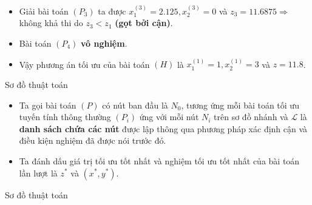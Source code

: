 \documentclass[10pt]{beamer}
\begin{document}
\begin{frame}
    \begin{itemize} 
    \item<1-> Giải bài toán $(P_3)$ ta được $x^{(3)}_1=2.125, x^{(3)}_2=0$ và $z_3=11.6875 \Rightarrow $ không khả thi do $z_3 < z_1$ \textbf{(gọt bởi cận)}. 
    \medskip
    \item<1-> Bài toán $(P_4)$ \textbf{vô nghiệm}.
    \bigskip
    \item<2-> Vậy phương án tối ưu của bài toán $(H)$ là $x^{(1)}_1=1, x^{(1)}_2=3$ và $z=11.8$.
\end{itemize}
\end{frame}

\begin{frame}{Sơ đồ thuật toán}
\begin{itemize}
\item Ta gọi bài toán $(P)$ có nút ban đầu là $N_0$, tương ứng mỗi bài toán tối ưu tuyến tính thông thường $(P_i)$ ứng với mỗi nút $N_i$ trên sơ đồ nhánh và $\mathcal{L}$ là \textbf{danh sách chứa các nút} được lập thông qua phương pháp xác định cận và điều kiện nghiệm đã được nói trước đó.
\bigskip
\item Ta đánh dấu giá trị tối ưu tốt nhất và nghiệm tối ưu tốt nhất của bài toán lần lượt là $z^*$ và $(x^*,y^*)$.
\end{itemize}
\end{frame}

\begin{frame}{Sơ đồ thuật toán}
\small
\setlength{\parindent}{4em}
\end{frame}    
\end{document}
